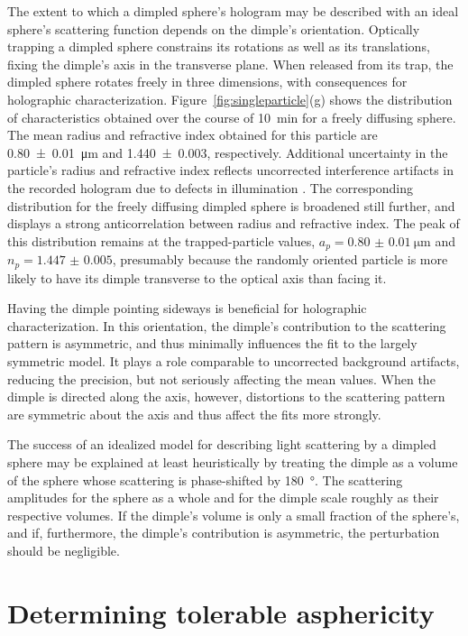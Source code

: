 The extent to which a dimpled sphere's hologram may be described
with an ideal sphere's scattering function depends on the dimple's
orientation.
Optically trapping a dimpled sphere constrains its rotations 
as well as its translations, fixing the dimple's axis in the
transverse plane.
When released from its trap, the dimpled sphere rotates freely in three
dimensions, with consequences for holographic characterization.
Figure~\ref{fig:singleparticle}(g) shows the distribution of characteristics
obtained over the course of \SI{10}{\minute} for a freely diffusing
sphere.
The mean radius and refractive index obtained for this particle are
\SI{0.80(1)}{\um} and \num{1.440(3)}, respectively.
Additional uncertainty in the particle's radius and refractive index
reflects uncorrected interference artifacts in the recorded hologram due
to defects in illumination \cite{krishnatreya14}.
The corresponding distribution for the freely diffusing dimpled sphere
is broadened still further, and displays a strong anticorrelation between
radius and refractive index.
The peak of this distribution remains at the trapped-particle values,
$a_p = \SI{0.80(1)}{\um}$ and $n_p = \num{1.447(5)}$,
presumably because the randomly oriented particle is more likely 
to have its dimple transverse to the optical axis than facing it.

Having the dimple pointing sideways is beneficial for holographic
characterization.  In this orientation, the dimple's contribution to the 
scattering pattern is asymmetric, and thus minimally influences the
fit to the largely symmetric model.  It plays a role comparable to
uncorrected background artifacts, reducing the precision, but not
seriously affecting the mean values.
When the dimple is directed along the axis, however, distortions to
the scattering pattern are symmetric about the axis and thus affect
the fits more strongly.


The success of an idealized model for describing light scattering by a
dimpled sphere may be explained at least heuristically by treating
the dimple as a volume of the sphere whose scattering is phase-shifted
by \SI{180}{\degree}.
The scattering amplitudes for the sphere as a whole and for the dimple
scale roughly as their respective volumes.
If the dimple's volume is only a small fraction of the
sphere's, and if, furthermore, the dimple's contribution is asymmetric,
the perturbation should be negligible.


\section{Determining tolerable asphericity}


